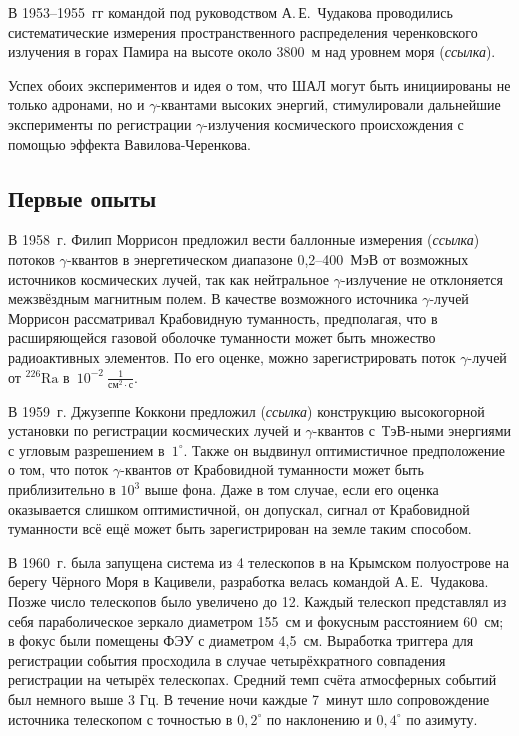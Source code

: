 \documentclass[magd,floatypics,numeref]{msudipl} %
\begin{document}
В 1953--1955~гг командой под руководством А.\,Е.~Чудакова проводились систематические измерения пространственного распределения черенковского излучения в горах Памира на высоте около 3800~м над уровнем моря (\textit{ссылка}).

Успех обоих экспериментов и идея о том, что ШАЛ могут быть инициированы не только адронами, но и $\gamma$-квантами высоких энергий, стимулировали дальнейшие эксперименты по регистрации $\gamma$-излучения космического происхождения с помощью эффекта Вавилова-Черенкова. 
\subsection{Первые опыты}
В 1958~г. Филип Моррисон предложил вести баллонные измерения  (\textit{ссылка}) потоков $\gamma$-квантов в энергетическом диапазоне 0,2--400~МэВ от возможных источников космических лучей, так как нейтральное  $\gamma$-излучение не отклоняется межзвёздным магнитным полем. В качестве возможного источника $\gamma$-лучей Моррисон рассматривал Крабовидную туманность, предполагая, что в расширяющейся газовой оболочке туманности может быть множество радиоактивных элементов. По его оценке, можно зарегистрировать поток $\gamma$-лучей от $^{226}\text{Ra}$ в~$10^{-2}~\frac{1}{\text{см}^2\cdot\text{с}}$.

В 1959~г. Джузеппе Коккони предложил  (\textit{ссылка}) конструкцию высокогорной установки по регистрации космических лучей и $\gamma$-квантов с~ТэВ-ными энергиями с угловым разрешением в~$1^\circ$. Также он выдвинул оптимистичное предположение о том, что поток $\gamma$-квантов от Крабовидной туманности может быть приблизительно в $10^3$  выше фона. Даже в том случае, если его оценка оказывается слишком оптимистичной, он допускал, сигнал от Крабовидной туманности всё ещё может быть зарегистрирован на земле таким способом. 

В 1960~г. была запущена система из 4 телескопов в на Крымском полуострове на берегу Чёрного Моря в Кацивели, разработка велась командой А.\,Е.~Чудакова. Позже число телескопов было увеличено до 12. Каждый телескоп представлял из себя параболическое зеркало диаметром 155~см и фокусным расстоянием 60~см; в фокус были помещены ФЭУ с диаметром 4,5~см. Выработка триггера для регистрации события просходила в случае четырёхкратного совпадения регистрации на четырёх телескопах. Средний темп счёта атмосферных событий был немного выше  3 Гц. В течение ночи каждые 7~минут шло сопровождение источника телескопом с точностью в $0,2^{\circ}$ по наклонению и $0,4^{\circ}$ по азимуту.
\end{document}
